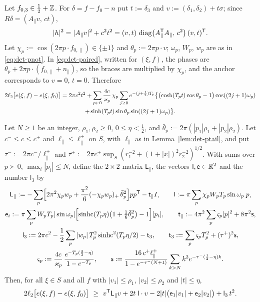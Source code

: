 Let $f_{0,3}\in\frac12+\mathbb Z$. For $\delta=f-f_0-n$ put $t:=\delta_3$ and $v:=(\delta_1,\delta_2)+t\sigma$; since
$R\delta=(A_\parallel v,\,ct)$,
\begin{equation}\label{eq:det-hv}
  |h|^2=|A_\parallel v|^2+c^2t^2=(v,t)\,\operatorname{diag}\bigl(A_\parallel^\mathsf T A_\parallel,\,c^2\bigr)\,(v,t)^\mathsf T .
\end{equation}
Let $\chi_p:=\cos(2\pi p\cdot f_{0,\parallel})\in\{\pm1\}$ and $\theta_p:=2\pi p\cdot v$; $\omega_p$, $W_p$, $w_p$ are as in
\eqref{eq:det-pnot}. In \eqref{eq:det-paired}, written for $(\xi,f)$, the phases are $\theta_p+2\pi p\cdot(f_{0,\parallel}+n_\parallel)$,
so the braces are multiplied by $\chi_p$, and the anchor corresponds to $v=0$, $t=0$. Therefore
\begin{multline}\label{eq:det-layerdiff}
  2\ell_2\bigl[e(\xi,f)-e(\xi,f_0)\bigr]=2\pi c^2t^2+\sum_{p\succ0}\frac{4c}{\varkappa_p}\,\chi_p\sum_{j\ge0}e^{-(j+\frac12)T_p}
   \bigl\{\bigl(\cosh(T_pt)\cos\theta_p-1\bigr)\cos((2j+1)\omega_p)\\+\sinh(T_pt)\sin\theta_p\sin((2j+1)\omega_p)\bigr\}.
\end{multline}

\begin{lemma}\label{lem:det-layer}
Let $N\ge1$ be an integer, $\rho_1,\rho_2\ge0$, $0\le\eta<\frac12$, and $\bar\theta_p:=2\pi(|p_1|\rho_1+|p_2|\rho_2)$. Let
$c^-\le c\le c^+$ and $\ell_\parallel\le\ell_\parallel^+$ on $S$, with $\ell_\parallel$ as in Lemma~\ref{lem:det-ptail}, and put
$\tau^-:=2\pi c^-/\ell_\parallel^+$ and $\tau^+:=2\pi c^+\sup_S(r_1^{-2}+(1+|x|)^2r_2^{-2})^{1/2}$. With sums over $p\succ0$,
$\max_i|p_i|\le N$, define the $2\times2$ matrix $\mathsf L_\parallel$, the vectors $\mathsf l,\mathsf e\in\mathbb R^2$ and the number
$\mathsf l_3$ by
\begin{gather*}
  \mathsf L_\parallel:=-\sum_p\Bigl[2\pi^2\chi_pw_p+\frac{\pi^2}6(-\chi_pw_p)_+\,\bar\theta_p^2\Bigr]pp^\mathsf T-\mathsf t_\parallel I,\qquad
  \mathsf l:=\pi\sum_p\chi_pW_pT_p\sin\omega_p\;p,\\
  \mathsf e_i:=\pi\sum_pW_pT_p|\sin\omega_p|\Bigl[\operatorname{sinhc}(T_p\eta)\bigl(1+\tfrac16\bar\theta_p^2\bigr)-1\Bigr]|p_i|,\qquad
  \mathsf t_\parallel:=4\pi^2\sum_p\varsigma_p|p|^2+8\pi^2\mathsf s,\\
  \mathsf l_3:=2\pi c^2-\frac12\sum_p|w_p|\,T_p^2\operatorname{sinhc}^2(T_p\eta/2)-\mathsf t_3,\qquad\mathsf t_3:=\sum_p\varsigma_pT_p^2+(\tau^+)^2\mathsf s,\\
  \varsigma_p:=\frac{4c}{\varkappa_p}\,\frac{e^{-T_p(\frac32-\eta)}}{1-e^{-T_p}},\qquad
  \mathsf s:=\frac{16\,c^+\ell_\parallel^+}{1-e^{-\tau^-(N+1)}}\sum_{k>N}k^2e^{-\tau^-(\frac12-\eta)k}.
\end{gather*}
Then, for all $\xi\in S$ and all $f$ with $|v_1|\le\rho_1$, $|v_2|\le\rho_2$ and $|t|\le\eta$,
\begin{equation}\label{eq:det-layer}
  2\ell_2\bigl[e(\xi,f)-e(\xi,f_0)\bigr]\ \ge\ v^\mathsf T\mathsf L_\parallel v+2t\;\mathsf l\cdot v-2|t|\bigl(\mathsf e_1|v_1|+\mathsf e_2|v_2|\bigr)+\mathsf l_3\,t^2 .
\end{equation}
\end{lemma}

